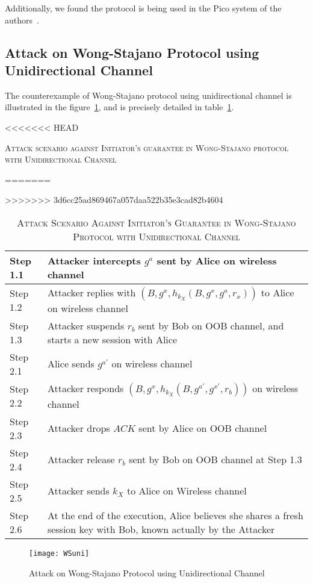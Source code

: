 Additionally, we found the protocol is being used in the Pico system of the authors~\cite{Stajano:2014aa}. 
 
\subsection{Attack on Wong-Stajano Protocol using Unidirectional Channel}

The counterexample of Wong-Stajano protocol using unidirectional channel is illustrated in the figure~\ref{WSuniattack}, and is precisely detailed in table~\ref{WSuniattack}. 

\begin{table}[t]
\centering
<<<<<<< HEAD
\caption{\textsc{Attack scenario against Initiator's guarantee in Wong-Stajano protocol with Unidirectional Channel}}
=======
\caption{\textsc{Attack Scenario Against Initiator's Guarantee in Wong-Stajano Protocol with Unidirectional Channel}}
>>>>>>> 3d6cc25ad869467a057daa522b35e3cad82b4604
\label{WSuniattack}
{\small
\begin{tabular}{| l | p{11cm} |}
 \hline
 Step 1.1 & Attacker intercepts $g^{a}$ sent by Alice on wireless channel\\ \hline
 Step 1.2 & Attacker replies with $(B, g^{x}, h_{k_X}(B,g^{x},g^a,r_x))$ to Alice on wireless channel\\ \hline
 Step 1.3 & Attacker suspends $r_b$ sent by Bob on OOB channel, and starts a new session with Alice\\ \hline \hline
 Step 2.1 & Alice sends $g^{a'}$ on wireless channel\\ \hline
 Step 2.2 & Attacker responds $(B, g^{x}, h_{k_X}(B,g^{a'},g^{x'},r_b))$ on wireless channel\\ \hline
 Step 2.3 & Attacker drops $ACK$ sent by Alice on OOB channel\\ \hline
 Step 2.4 & Attacker release $r_b$ sent by Bob on OOB channel at Step 1.3\\ \hline
 Step 2.5 & Attacker sends $k_X$ to Alice on Wireless channel\\ \hline
 Step 2.6 & At the end of the execution, Alice believes she shares a fresh session key with Bob, known actually by the Attacker\\ \hline
\end{tabular}
}
\end{table}

\begin{figure}
  \centering
  \texttt{[image: WSuni]}
  \caption{Attack on Wong-Stajano Protocol using Unidirectional Channel}
  \label{WSuniattack}
\end{figure}

